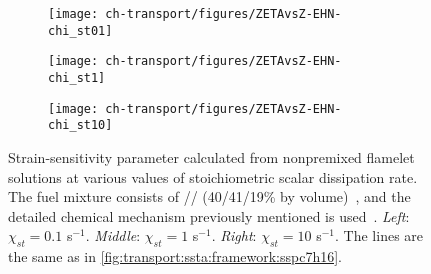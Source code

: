 
\begin{figure}[ht]
  \centering
  \begin{subfigure}[b]{0.33\linewidth}
    \texttt{[image: ch-transport/figures/ZETAvsZ-EHN-chi\_st01]}
  \end{subfigure}%
  \begin{subfigure}[b]{0.33\linewidth}
    \texttt{[image: ch-transport/figures/ZETAvsZ-EHN-chi\_st1]}
  \end{subfigure}%
  \begin{subfigure}[b]{0.33\linewidth}
    \texttt{[image: ch-transport/figures/ZETAvsZ-EHN-chi\_st10]}
  \end{subfigure}
  \caption[Dependency of Strain-Sensitivity Parameter \texorpdfstring{$\zeta_k$}{Zk} on \texorpdfstring{$\chi_{st}$}{Xst}]{Strain-sensitivity parameter calculated from nonpremixed flamelet solutions at various values of stoichiometric scalar dissipation rate. The fuel mixture consists of // (40/41/19\% by volume)~\cite{mahmoud2017}, and the detailed chemical mechanism previously mentioned is used~\cite{blanquart2009588,narayanaswamy2010}. \textit{Left}: $\chi_{st} = 0.1$ s$^{-1}$. \textit{Middle}: $\chi_{st} = 1$ s$^{-1}$. \textit{Right}: $\chi_{st} = 10$ s$^{-1}$. The lines are the same as in \cref{fig:transport:ssta:framework:sspc7h16}.}
  \label{fig:transport:ssta:dependencies:chist}
\end{figure}


